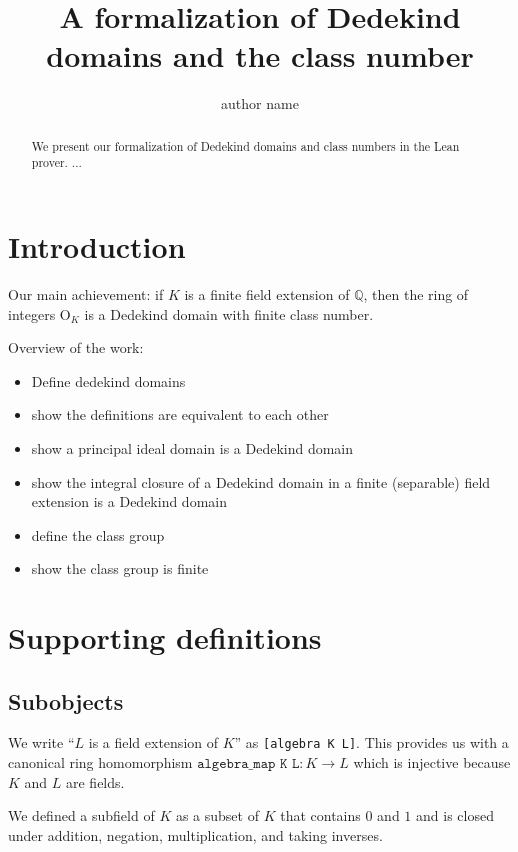 \documentclass{lipics-v2021}
\title{A formalization of Dedekind domains and the class number}
\author{author name}{affiliation}{email}{orcid}{funding}
\newcommand{\lean}[1]{\texttt{#1}\xspace} %
\newcommand{\OK}{\mathrm{O}_K}
\newcommand{\Q}{\mathbb{Q}}
\begin{document}
\maketitle

\begin{abstract}
We present our formalization of Dedekind domains and class numbers in the Lean prover. ...
\end{abstract}

\section{Introduction}

Our main achievement: if $K$ is a finite field extension of $\Q$, then the ring of integers $\OK$ is a Dedekind domain with finite class number.

Overview of the work:
\begin{itemize}
 \item Define dedekind domains
 \item show the definitions are equivalent to each other
 \item show a principal ideal domain is a Dedekind domain
 \item show the integral closure of a Dedekind domain in a finite (separable) field extension is a Dedekind domain
 \item define the class group
 \item show the class group is finite
\end{itemize}

\section{Supporting definitions}


\subsection{Subobjects}
We write ``$L$ is a field extension of $K$'' as \lean{[algebra K L]}. This provides us with a canonical ring homomorphism $\lean{algebra\_map K L} : K \to L$ which is injective because $K$ and $L$ are fields.

We defined a subfield of $K$ as a subset of $K$ that contains $0$ and $1$ and is closed under addition, negation, multiplication, and taking inverses.
\end{document}
